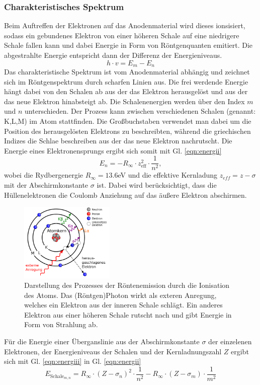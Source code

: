 \subsubsection*{Charakteristisches Spektrum}
Beim Auftreffen der Elektronen auf das Anodenmaterial wird dieses ionsisiert, sodass
ein gebundenes Elektron von einer höheren Schale auf eine niedrigere Schale fallen kann und dabei
Energie in Form von Röntgenquanten emitiert. Die abgestrahlte Energie entspricht dann der Differenz
der Energieniveaus.
\begin{equation}
    h\cdot v=E_m-E_n
    \label{eqn:energii}
\end{equation}
Das charakteristische Spektrum ist vom Anodenmaterial abhängig und zeichnet sich im
Röntgenspektrum durch scharfen Linien aus.
Die frei werdende Energie hängt dabei von den Schalen ab aus der das Elektron herausgelöst
und aus der das neue Elektron hinabsteigt ab. Die Schalenenergien werden über den Index $m$ und $n$
unterschieden. Der Prozess kann zwischen verschiedenen Schalen (genannt: K,L,M) im Atom 
stattfinden. Die Großbuchstaben verwendet man dabei um die Position des herausgelösten Elektrons zu 
beschreibten, während die griechischen Indizes die Schlae beschreiben aus der das neue Elektron 
nachrutscht.
Die Energie eines Elektronensprungs ergibt sich somit mit Gl. \ref{eqn:energii}
\begin{equation}
    E_n=-R_{\infty}\cdot z_{\text{eff}}^2 \cdot \frac{1}{n^2},
    \label{eqn:energiii}
\end{equation}
wobei die Rydbergenergie $R_{\infty}=13.6$eV und die effektive Kernladung 
$z_{eff}=z-\sigma$ mit der Abschirmkonstante $\sigma$ ist. Dabei wird berücksichtigt,
dass die Hüllenelektronen die Coulomb Anziehung auf das äußere Elektron abschirmen.
\begin{figure}
    \centering
    \includegraphics[width=0.4\textwidth]{plots/chS.png}
    \caption{Darstellung des Prozesses der Röntenemission durch die
    Ionisation des Atoms. Das (Röntgen)Photon wirkt als exteren Anregung, welches
    ein Elektron aus der inneren Schale schlägt. Ein anderes Elektron aus einer
    höheren Schale rutscht nach und gibt Energie in Form von Strahlung ab.\cite{wiki}}
\end{figure}
Für die Energie einer Überganslinie aus der Abschirmkonstante $\sigma$ der einzelenen Elektronen, der Energieniveaus
der Schalen und der Kernladnungszahl $Z$ ergibt sich mit Gl. \ref{eqn:energiii} in Gl. \ref{eqn:energii}
\begin{equation}
    E_{\text{Schale}_{m,n}}=R_{\infty}\cdot (Z-\sigma_n)^2\cdot \frac{1}{n^2}-R_{\infty}\cdot (Z-\sigma_m)\cdot \frac{1}{m^2}
\end{equation}
